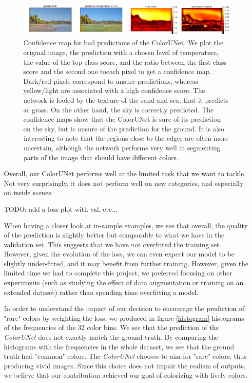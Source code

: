 \documentclass[10pt,twocolumn,letterpaper]{article}
\begin{document}
\begin{figure}
\begin{center}
\includegraphics[width=450px]{confidence}
\caption{Confidence map for bad predictions of the ColorUNet. We plot the original image, the prediction with a chosen level of temperature, the value of the top class score, and the ratio between the first class score and the second one toeach pixel to get a confidence map. Dark/red pixels correspond to unsure predictions, whereas yellow/light are associated with a high confidence score. The network is fooled by the texture of the sand and sea, that it predicts as grass. On the other hand, the sky is correctly predicted. The confidence maps show that the ColorUNet is sure of its prediction on the sky, but is unsure of the prediction for the ground. It is also interesting to note that the regions close to the edges are often more uncertain, although the network performs very well in segmenting parts of the image that should have different colors.}
\label{confidence}
\end{center}
\end{figure}

Overall, our ColorUNet performs well at the limited task that we want to tackle. Not very surprisingly, it does not perform well on new categories, and especially on inside scenes.

TODO: add a loss plot with val, etc...

When having a closer look at in-sample examples, we see that overall, the quality of the prediction is slightly better but comparable to what we have in the validation set. This suggests that we have not overfitted the training set. However, given the evolution of the loss, we can even expect our model to be slightly under-fitted, and it may benefit from further training. However, given the limited time we had to complete this project, we preferred focusing on other experiments (such as studying the effect of data augmentation or training on an extended dataset) rather than spending time overfitting a model.

In order to understand the impact of our decision to encourage the prediction of "rare" colors by weighting the loss, we produced in figure \ref{histogram} histograms of the frequencies of the 32 color bins. We see that the prediction of the \textit{ColorUNet} does not exactly match the ground truth. By comparing the histograms with the frequencies in the whole dataset, we see that the ground truth had "common" colors. The \textit{ColorUNet} chooses to aim for "rare" colors, thus producing vivid images. Since this choice does not impair the realism of outputs, we believe that our contribution achieved our goal of colorizing with lively colors.
\end{document}
